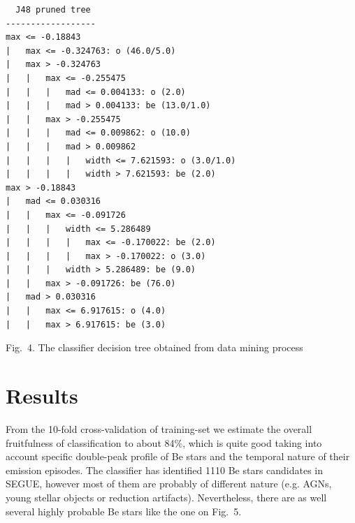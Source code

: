 \documentclass[11pt,twoside]{article}
\begin{document}
\begin{lstlisting}
  J48 pruned tree
------------------
max <= -0.18843
|   max <= -0.324763: o (46.0/5.0)
|   max > -0.324763
|   |   max <= -0.255475
|   |   |   mad <= 0.004133: o (2.0)
|   |   |   mad > 0.004133: be (13.0/1.0)
|   |   max > -0.255475
|   |   |   mad <= 0.009862: o (10.0)
|   |   |   mad > 0.009862
|   |   |   |   width <= 7.621593: o (3.0/1.0)
|   |   |   |   width > 7.621593: be (2.0)
max > -0.18843
|   mad <= 0.030316
|   |   max <= -0.091726
|   |   |   width <= 5.286489
|   |   |   |   max <= -0.170022: be (2.0)
|   |   |   |   max > -0.170022: o (3.0)
|   |   |   width > 5.286489: be (9.0)
|   |   max > -0.091726: be (76.0)
|   mad > 0.030316
|   |   max <= 6.917615: o (4.0)
|   |   max > 6.917615: be (3.0)
\end{lstlisting}


\parbox{0.999\textwidth}{Fig.~4. The classifier decision tree obtained from data mining process} 
%



\section{Results}

From the 10-fold cross-validation of training-set we estimate the overall
fruitfulness of classification to about 84\%, which is quite good taking into
account specific  double-peak profile  of Be stars and the temporal nature of
their emission episodes. The classifier has identified 1110 Be stars
candidates in SEGUE, however most of them are probably of different nature
(e.g. AGNs, young stellar objects or reduction artifacts). Nevertheless, there
are as well several highly probable  Be stars like the one on Fig.~5.
\end{document}
